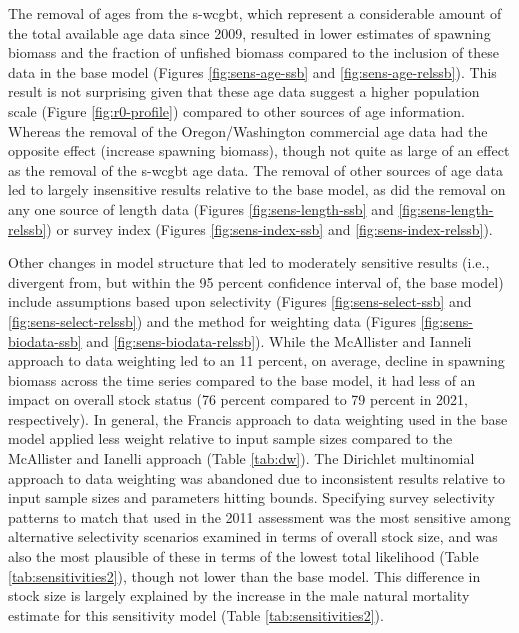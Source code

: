 \documentclass[11pt,
  english,
  a4paper,
]{article}
\begin{document}
\leavevmode\tagmcend\tagstructend\par


The removal of ages from the \gls{s-wcgbt}, which represent a considerable amount of the total available age data since 2009, resulted in lower estimates of spawning biomass and the fraction of unfished biomass compared to the inclusion of these data in the base model (Figures \ref{fig:sens-age-ssb} and \ref{fig:sens-age-relssb}). This result is not surprising given that these age data suggest a higher population scale (Figure \ref{fig:r0-profile}) compared to other sources of age information. Whereas the removal of the Oregon/Washington commercial age data had the opposite effect (increase spawning biomass), though not quite as large of an effect as the removal of the \gls{s-wcgbt} age data. The removal of other sources of age data led to largely insensitive results relative to the base model, as did the removal on any one source of length data (Figures \ref{fig:sens-length-ssb} and \ref{fig:sens-length-relssb}) or survey index (Figures \ref{fig:sens-index-ssb} and \ref{fig:sens-index-relssb}).

\leavevmode\tagmcend\tagstructend\par


Other changes in model structure that led to moderately sensitive results (i.e., divergent from, but within the 95 percent confidence interval of, the base model) include assumptions based upon selectivity (Figures \ref{fig:sens-select-ssb} and \ref{fig:sens-select-relssb}) and the method for weighting data (Figures \ref{fig:sens-biodata-ssb} and \ref{fig:sens-biodata-relssb}). While the McAllister and Ianneli approach to data weighting led to an 11 percent, on average, decline in spawning biomass across the time series compared to the base model, it had less of an impact on overall stock status (76 percent compared to 79 percent in 2021, respectively). In general, the Francis approach to data weighting used in the base model applied less weight relative to input sample sizes compared to the McAllister and Ianelli approach (Table \ref{tab:dw}). The Dirichlet multinomial approach to data weighting was abandoned due to inconsistent results relative to input sample sizes and parameters hitting bounds. Specifying survey selectivity patterns to match that used in the 2011 assessment was the most sensitive among alternative selectivity scenarios examined in terms of overall stock size, and was also the most plausible of these in terms of the lowest total likelihood (Table \ref{tab:sensitivities2}), though not lower than the base model. This difference in stock size is largely explained by the increase in the male natural mortality estimate for this sensitivity model (Table \ref{tab:sensitivities2}).
\end{document}
